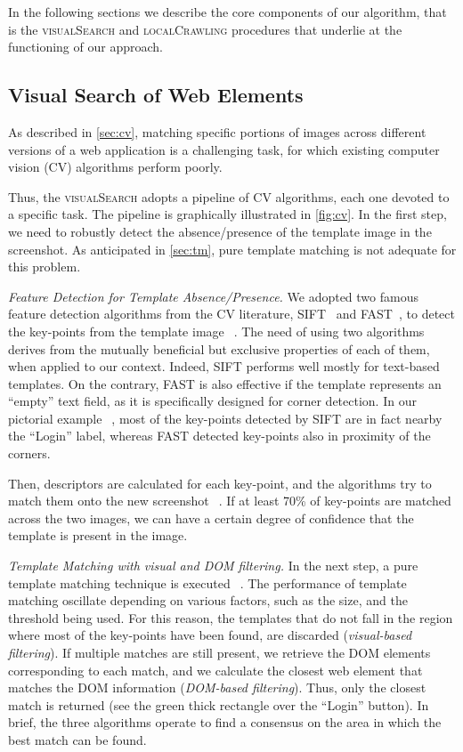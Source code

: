 In the following sections we describe the core components of our algorithm, that is the \textsc{visualSearch} and \textsc{localCrawling} procedures that underlie at the functioning of our approach.

\subsection{Visual Search of Web Elements}

As described in \autoref{sec:cv}, matching specific portions of images across different versions of a web application is a challenging task, for which existing computer vision (CV) algorithms perform poorly. 

Thus, the \textsc{visualSearch} adopts a pipeline of CV algorithms, each one devoted to a specific task. The pipeline is graphically illustrated in \autoref{fig:cv}. In the first step, we need to robustly detect the absence/presence of the template image in the screenshot. As anticipated in \autoref{sec:tm}, pure template matching is not adequate for this problem. 

\textit{Feature Detection for Template Absence/Presence.}
We adopted two famous feature detection algorithms from the CV literature, SIFT~\cite{Lowe1999,Lowe2004} and FAST~\cite{rosten2005tracking,rosten2008faster}, to detect the key-points from the template image~\textcircled{}. The need of using two algorithms derives from the mutually beneficial but exclusive properties of each of them, when applied to our context. Indeed, SIFT performs well mostly for text-based templates. On the contrary, FAST is also effective if the template represents an ``empty'' text field, as it is specifically designed for corner detection. In our pictorial example~\textcircled{}, most of the key-points detected by SIFT are in fact nearby the ``Login'' label, whereas FAST detected key-points also in proximity of the corners.
 
Then, descriptors are calculated for each key-point, and the algorithms try to match them onto the new screenshot~\textcircled{}.
If at least 70\% of key-points are matched across the two images, we can have a certain degree of confidence that the template is present in the image. 

\textit{Template Matching with visual and DOM filtering.}
In the next step, a pure template matching technique is executed~\textcircled{}. The performance of template matching oscillate depending on various factors, such as the size, and the threshold being used. For this reason, the templates that do not fall in the region where most of the key-points have been found, are discarded (\textit{visual-based filtering}). If multiple matches are still present, we retrieve the DOM elements corresponding to each match, and we calculate the closest web element that matches the DOM information (\textit{DOM-based filtering}).
Thus, only the closest match is returned (see the green thick rectangle over the ``Login'' button). In brief, the three algorithms operate to find a consensus on the area in which the best match can be found. 


